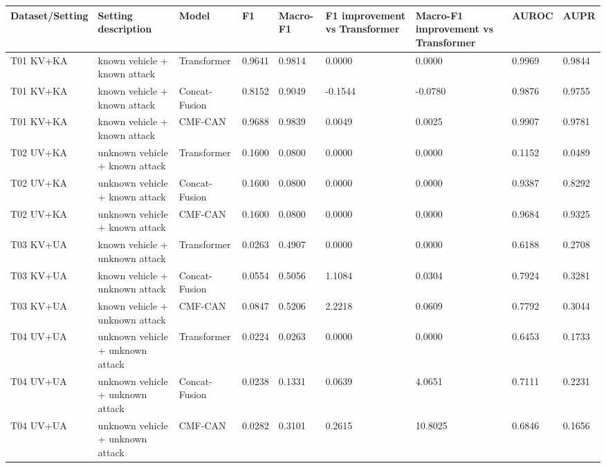 \begin{tabular}{lllllllll}
\toprule
Dataset/Setting & Setting description & Model & F1 & Macro-F1 & F1 improvement vs Transformer & Macro-F1 improvement vs Transformer & AUROC & AUPR \\
\midrule
T01 KV+KA & known vehicle + known attack & Transformer & 0.9641 & 0.9814 & 0.0000 & 0.0000 & 0.9969 & 0.9844 \\
T01 KV+KA & known vehicle + known attack & Concat-Fusion & 0.8152 & 0.9049 & -0.1544 & -0.0780 & 0.9876 & 0.9755 \\
T01 KV+KA & known vehicle + known attack & CMF-CAN & 0.9688 & 0.9839 & 0.0049 & 0.0025 & 0.9907 & 0.9781 \\
T02 UV+KA & unknown vehicle + known attack & Transformer & 0.1600 & 0.0800 & 0.0000 & 0.0000 & 0.1152 & 0.0489 \\
T02 UV+KA & unknown vehicle + known attack & Concat-Fusion & 0.1600 & 0.0800 & 0.0000 & 0.0000 & 0.9387 & 0.8292 \\
T02 UV+KA & unknown vehicle + known attack & CMF-CAN & 0.1600 & 0.0800 & 0.0000 & 0.0000 & 0.9684 & 0.9325 \\
T03 KV+UA & known vehicle + unknown attack & Transformer & 0.0263 & 0.4907 & 0.0000 & 0.0000 & 0.6188 & 0.2708 \\
T03 KV+UA & known vehicle + unknown attack & Concat-Fusion & 0.0554 & 0.5056 & 1.1084 & 0.0304 & 0.7924 & 0.3281 \\
T03 KV+UA & known vehicle + unknown attack & CMF-CAN & 0.0847 & 0.5206 & 2.2218 & 0.0609 & 0.7792 & 0.3044 \\
T04 UV+UA & unknown vehicle + unknown attack & Transformer & 0.0224 & 0.0263 & 0.0000 & 0.0000 & 0.6453 & 0.1733 \\
T04 UV+UA & unknown vehicle + unknown attack & Concat-Fusion & 0.0238 & 0.1331 & 0.0639 & 4.0651 & 0.7111 & 0.2231 \\
T04 UV+UA & unknown vehicle + unknown attack & CMF-CAN & 0.0282 & 0.3101 & 0.2615 & 10.8025 & 0.6846 & 0.1656 \\
\bottomrule
\end{tabular}
